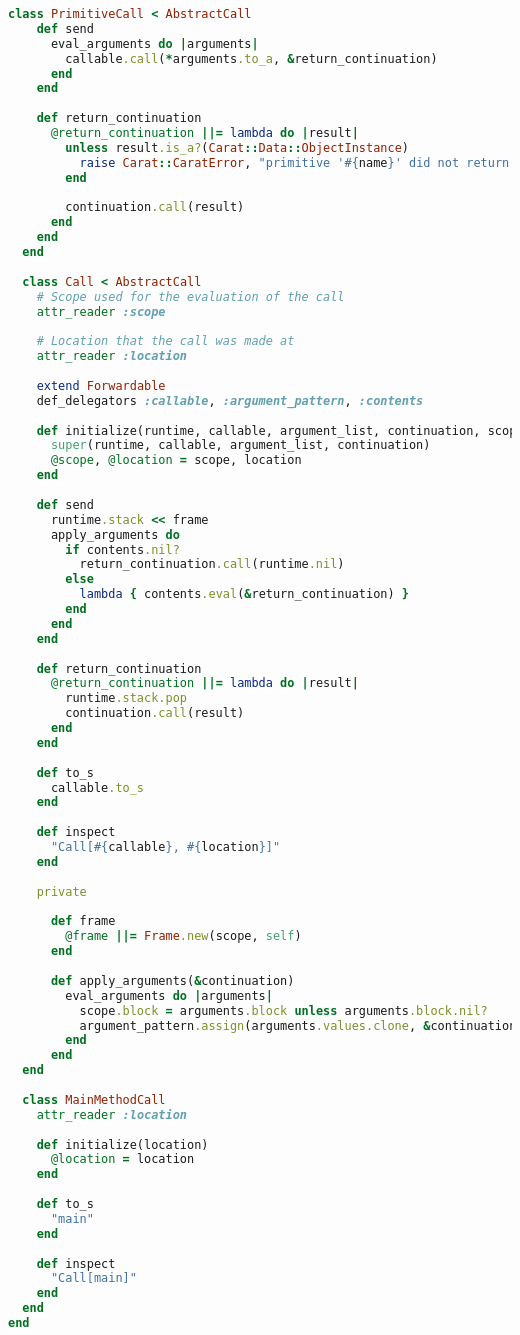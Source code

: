 \begin{lstlisting}[title={\small\ttfamily\bfseries runtime/call.rb},language=Ruby]
  class PrimitiveCall < AbstractCall
    def send
      eval_arguments do |arguments|
        callable.call(*arguments.to_a, &return_continuation)
      end
    end
    
    def return_continuation
      @return_continuation ||= lambda do |result|
        unless result.is_a?(Carat::Data::ObjectInstance)
          raise Carat::CaratError, "primitive '#{name}' did not return an ObjectInstance: #{result.inspect}"
        end
        
        continuation.call(result)
      end
    end
  end
  
  class Call < AbstractCall
    # Scope used for the evaluation of the call
    attr_reader :scope
    
    # Location that the call was made at
    attr_reader :location
    
    extend Forwardable
    def_delegators :callable, :argument_pattern, :contents
    
    def initialize(runtime, callable, argument_list, continuation, scope, location)
      super(runtime, callable, argument_list, continuation)
      @scope, @location = scope, location
    end
    
    def send
      runtime.stack << frame
      apply_arguments do
        if contents.nil?
          return_continuation.call(runtime.nil)
        else
          lambda { contents.eval(&return_continuation) }
        end
      end
    end
    
    def return_continuation
      @return_continuation ||= lambda do |result|
        runtime.stack.pop
        continuation.call(result)
      end
    end
    
    def to_s
      callable.to_s
    end
    
    def inspect
      "Call[#{callable}, #{location}]"
    end
    
    private
    
      def frame
        @frame ||= Frame.new(scope, self)
      end
      
      def apply_arguments(&continuation)
        eval_arguments do |arguments|
          scope.block = arguments.block unless arguments.block.nil?
          argument_pattern.assign(arguments.values.clone, &continuation)
        end
      end
  end
  
  class MainMethodCall
    attr_reader :location
    
    def initialize(location)
      @location = location
    end
    
    def to_s
      "main"
    end
    
    def inspect
      "Call[main]"
    end
  end
end

\end{lstlisting}
